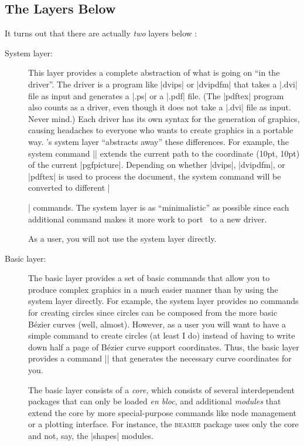 \subsection{The Layers Below \tikzname}

It turns out that there are actually \emph{two} layers below \tikzname:
%
\begin{description}
    \item[System layer:] This layer provides a complete abstraction of what
        is going on ``in the driver''. The driver is a program like |dvips|
        or |dvipdfm| that takes a |.dvi| file as input and generates a |.ps|
        or a |.pdf| file. (The |pdftex| program also counts as a driver, even
        though it does not take a |.dvi| file as input. Never mind.) Each
        driver has its own syntax for the generation of graphics, causing
        headaches to everyone who wants to create graphics in a portable way.
        \pgfname's system layer ``abstracts away'' these differences. For
        example, the system command |\pgfsys@lineto{10pt}{10pt}| extends the
        current path  to the coordinate (10pt, 10pt) of
        the current |{pgfpicture}|. Depending on whether |dvips|, |dvipdfm|,
        or |pdftex| is used to process the document, the system command will
        be converted to different |\special| commands. The system layer is as
        ``minimalistic'' as possible since each additional command makes it
        more work to port \pgfname\ to a new driver.

        As a user, you will not use the system layer directly.
    \item[Basic layer:] The basic layer provides a set of basic commands that
        allow you to produce complex graphics in a much easier manner than by
        using the system layer directly. For example, the system layer provides
        no commands for creating circles since circles can be composed from the
        more basic Bézier curves (well, almost). However, as a user you will
        want to have a simple command to create circles (at least I do) instead
        of having to write down half a page of Bézier curve support
        coordinates. Thus, the basic layer provides a command |\pgfpathcircle|
        that generates the necessary curve coordinates for you.

        The basic layer consists of a \emph{core}, which consists of several
        interdependent packages that can only be loaded \emph{en bloc}, and
        additional \emph{modules} that extend the core by more
        special-purpose commands like node management or a plotting
        interface. For instance, the \textsc{beamer} package uses only the
        core and not, say, the |shapes| modules.
\end{description}

